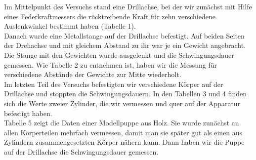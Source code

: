 Im Mittelpunkt des Versuchs stand eine Drillachse, bei der wir zunächst mit Hilfe eines Federkraftmessers die rücktreibende Kraft für zehn verschiedene Auslenkwinkel bestimmt haben (Tabelle 1). \\
Danach wurde eine Metallstange auf der Drillachse befestigt. Auf beiden Seiten der Drehachse und mit gleichem Abstand zu ihr war je ein Gewicht angebracht. Die Stange mit den Gewichten wurde ausgelenkt und die Schwingungsdauer gemessen. Wie Tabelle 2 zu entnehmen ist, haben wir die Messung für verschiedene Abstände der Gewichte zur Mitte wiederholt. \\
Im letzten Teil des Versuchs befestigten wir verschiedene Körper auf der Drillachse und stoppten die Schwingungsdauern. In den Tabellen 3 und 4 finden sich die Werte zweier Zylinder, die wir vermessen und quer auf der Apparatur befestigt haben. \\
Tabelle 5 zeigt die Daten einer Modellpuppe aus Holz. Sie wurde zunächst an allen Körperteilen mehrfach vermessen, damit man sie später gut als einen aus Zylindern zusammengesetzten Körper nähern kann. Dann haben wir die Puppe auf der Drillachse die Schwingungsdauer gemessen.